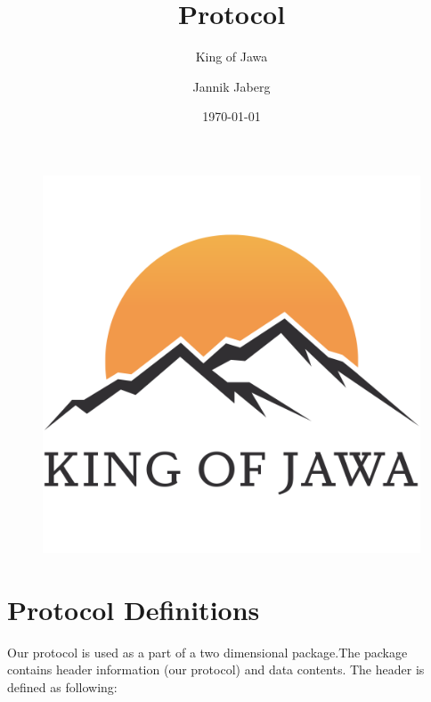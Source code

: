 \documentclass{scrartcl}
\title{Protocol}
\subtitle{King of Jawa}
\author{Jannik Jaberg}
\date{\today}
\begin{document}
\maketitle
\begin{figure}[H]
	\includegraphics[width=\linewidth]{LOGO.png}
\end{figure}

\tableofcontents


\pagebreak
\section{Protocol Definitions}
Our protocol is used as a part of a two dimensional package.The package contains header information (our protocol) and data contents. The header is defined as following:
\end{document}
